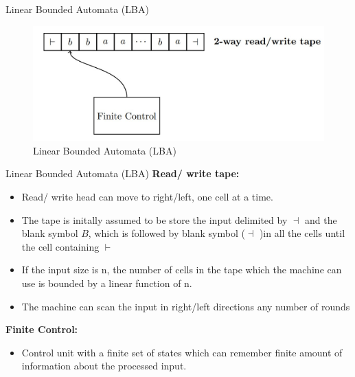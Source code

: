 \documentclass{beamer}
\begin{document}
\begin{frame}{Linear Bounded Automata (LBA)}
\begin{figure}
	\includegraphics[scale=.5]{img5/m1}
	\caption{Linear Bounded Automata (LBA)}
\end{figure}
\end{frame}
\begin{frame}{Linear Bounded Automata (LBA)}
\textbf{Read/ write tape:}
\begin{itemize}
	\item Read/ write head can move to right/left, one cell at a time.
	\item The tape is initally assumed to be store the input delimited by $\dashv$ and the blank symbol $B$, which is followed by blank symbol ($\dashv$ )in all the cells until the cell containing $\vdash$
	\item If the input size is n, the number of cells in the tape which the machine can use is bounded by a linear function of n.
	\item The machine can scan the input in right/left directions any number of rounds
\end{itemize}
\textbf{Finite Control:}
\begin{itemize}
	\item Control unit with a finite set of states which can remember finite amount of information about the processed input.
\end{itemize}
\end{frame}
\end{document}
